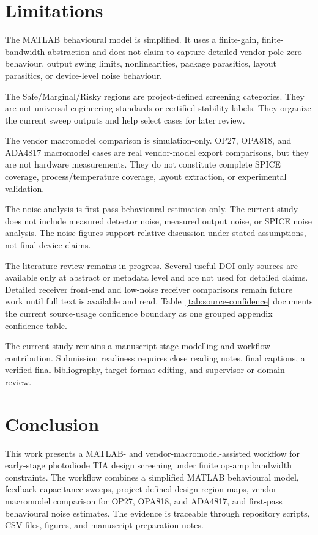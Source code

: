 \section{Limitations}

The MATLAB behavioural model is simplified. It uses a finite-gain, finite-bandwidth abstraction and does not claim to capture detailed vendor pole-zero behaviour, output swing limits, nonlinearities, package parasitics, layout parasitics, or device-level noise behaviour.

The Safe/Marginal/Risky regions are project-defined screening categories. They are not universal engineering standards or certified stability labels. They organize the current sweep outputs and help select cases for later review.

The vendor macromodel comparison is simulation-only. OP27, OPA818, and ADA4817 macromodel cases are real vendor-model export comparisons, but they are not hardware measurements. They do not constitute complete SPICE coverage, process/temperature coverage, layout extraction, or experimental validation.

The noise analysis is first-pass behavioural estimation only. The current study does not include measured detector noise, measured output noise, or SPICE noise analysis. The noise figures support relative discussion under stated assumptions, not final device claims.

The literature review remains in progress. Several useful DOI-only sources are available only at abstract or metadata level and are not used for detailed claims. Detailed receiver front-end and low-noise receiver comparisons remain future work until full text is available and read. Table~\ref{tab:source-confidence} documents the current source-usage confidence boundary as one grouped appendix confidence table.

The current study remains a manuscript-stage modelling and workflow contribution. Submission readiness requires close reading notes, final captions, a verified final bibliography, target-format editing, and supervisor or domain review.

\section{Conclusion}

This work presents a MATLAB- and vendor-macromodel-assisted workflow for early-stage photodiode TIA design screening under finite op-amp bandwidth constraints. The workflow combines a simplified MATLAB behavioural model, feedback-capacitance sweeps, project-defined design-region maps, vendor macromodel comparison for OP27, OPA818, and ADA4817, and first-pass behavioural noise estimates. The evidence is traceable through repository scripts, CSV files, figures, and manuscript-preparation notes.

